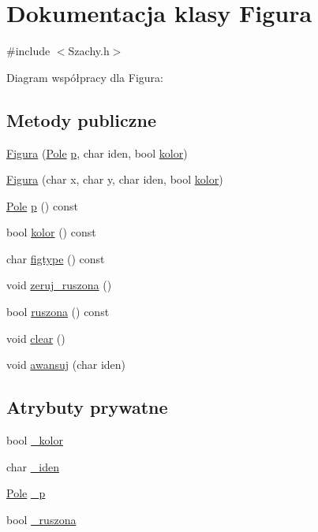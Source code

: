 \hypertarget{class_figura}{\section{\-Dokumentacja klasy \-Figura}
\label{class_figura}
}


{\ttfamily \#include $<$\-Szachy.\-h$>$}



\-Diagram współpracy dla \-Figura\-:
\subsection*{\-Metody publiczne}
\begin{DoxyCompactItemize}
\item 
\hyperlink{class_figura_a367128d959353c9077fa63fe340166e6}{\-Figura} (\hyperlink{class_pole}{\-Pole} \hyperlink{class_figura_ac5058dfe52b695fffaa14f1321ad94d1}{p}, char iden, bool \hyperlink{class_figura_a27f2e3dea90096db8ae8b9a7bd37373e}{kolor})
\item 
\hyperlink{class_figura_a894b291b0ffcab79bbd4868cd42aa747}{\-Figura} (char x, char y, char iden, bool \hyperlink{class_figura_a27f2e3dea90096db8ae8b9a7bd37373e}{kolor})
\item 
\hyperlink{class_pole}{\-Pole} \hyperlink{class_figura_ac5058dfe52b695fffaa14f1321ad94d1}{p} () const 
\item 
bool \hyperlink{class_figura_a27f2e3dea90096db8ae8b9a7bd37373e}{kolor} () const 
\item 
char \hyperlink{class_figura_ae2e0fe45dd744aa23073ea3435473e6a}{figtype} () const 
\item 
void \hyperlink{class_figura_a6f6951d3b85e9fb71d047b0c660d91c2}{zeruj\-\_\-ruszona} ()
\item 
bool \hyperlink{class_figura_aaffdaf6aa965b20fab82f76b56e6b339}{ruszona} () const 
\item 
void \hyperlink{class_figura_ab6320900a2be1b02dfc9cc611492298b}{clear} ()
\item 
void \hyperlink{class_figura_a4baa6e0d5d60b58c8002f519472e419b}{awansuj} (char iden)
\end{DoxyCompactItemize}
\subsection*{\-Atrybuty prywatne}
\begin{DoxyCompactItemize}
\item 
bool \hyperlink{class_figura_add53d15b05b4a3c580f20eaef2cf82e4}{\-\_\-kolor}
\item 
char \hyperlink{class_figura_aed673583322171e6545a7744b87a5dc0}{\-\_\-iden}
\item 
\hyperlink{class_pole}{\-Pole} \hyperlink{class_figura_a25ab1d2e33d9af3b5102611f4a7d6cc2}{\-\_\-p}
\item 
bool \hyperlink{class_figura_ad1b0a2ce4c66a6f48eabaf869a2c63f9}{\-\_\-ruszona}
\end{DoxyCompactItemize}


